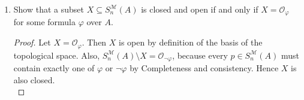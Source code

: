 \documentclass{article}
\begin{document}
\begin{enumerate}[label={\bf Q\arabic*:}]
\begin{enumerate}
\begin{proof}
          Finally, to show that the map is open, let
          $\phi'(x_1,\ldots,x_{m+n})$ be a formula over $B$. We need to
          show that $\mathcal{O}_{\phi',m+n}\restriction m$ is open in
          $S^{\mathcal{M}}_{m}(B)$. Let $\phi(x_1,\ldots,x_m)$ be the
          formula over $B$ in $m$ variables, defined as
          \[\phi(x_1,\ldots,x_m) := \exists x_{m+1},\ldots,x_{m+n}\;
          \phi'(x_1,\ldots,x_{m+n}).\] We show that
          $\mathcal{O}_{\phi',m+n}\restriction m=\mathcal{O}_{\phi,m}$,
          which is open in $S^{\mathcal{M}}_{m}(B)$. $\subseteq$ follows
          because every $p$ in $\mathcal{O}_{\phi',m+n}$ contains $\phi'$
          and thus also contains $\phi$ from consistency of $p$. To show
          $\supseteq$, let $q\in\mathcal{O}_{\phi,m}$. We need to find some
          $p\in\mathcal{O}_{\phi',m+n}$ such that $q=p\restriction m$. By
          Corollary 6.9, there is an elementary extension
          $\mathcal{N}\succeq\mathcal{M}$ and
          $\overline{a'}=(a_1,\ldots,a_m)\subseteq N$ such that
          $q=\text{tp}^\mathcal{N}(\overline{a'}/B)$. Then
          $\mathcal{N}\models\exists x_{m+1},\ldots,x_{m+n}\;
          \phi'(a_1,\ldots,a_m,x_{m+1},\ldots,x_{m+n})$, so there exists
          $a_{m+1},\ldots,a_{m+n}\subseteq N$ such that
          $\mathcal{N}\models\phi'(a_1,\ldots,a_{m+n})$. Let
          $\overline{a}=(a_1,\ldots,a_{m+n})\subseteq N$, and let
          $p=\text{tp}^\mathcal{N}(\overline{a}/B)$. Then from Corollary
          6.9 again, $p\in S^{\mathcal{M}}_{m+n}(B)$ and $\phi'\in p$, so
          $p\in\mathcal{O}_{\phi',m+n}$. Moreover, the
          restriction of $p$ is $q$. \\
        \end{proof}
    \end{enumerate}

  \item Show that a subset $X\subseteq S^{\mathcal{M}}_n(A)$ is closed and
    open if and only if $X=\mathcal{O}_\varphi$  for some formula $\varphi$
    over $A$.

    \begin{proof}
      Let $X=\mathcal{O}_\varphi$. Then $X$ is open by definition of the
      basis of the topological space. Also, $S^{\mathcal{M}}_n(A)\setminus
      X=\mathcal{O}_{\neg\varphi}$, because every $p\in
      S^{\mathcal{M}}_n(A)$ must contain exactly one of $\varphi$ or
      $\neg\varphi$ by Completeness and consistency. Hence $X$ is also
      closed. \\


\end{proof}
\end{enumerate}
\end{document}
